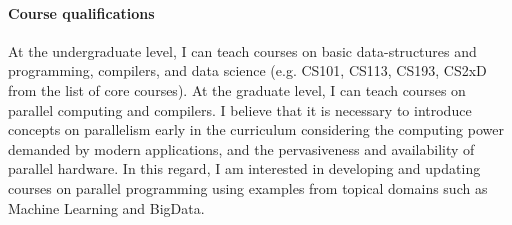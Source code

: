 \paragraph{Course qualifications}
At the undergraduate level, I can teach courses on basic data-structures and programming, compilers, and data science (e.g. CS101, CS113, CS193, CS2xD from the list of core courses). At the graduate level, I can teach courses on parallel computing and compilers.
I believe that it is necessary to introduce concepts on parallelism early in the curriculum considering the computing power demanded by modern applications, and the pervasiveness and availability of parallel hardware. 
In this regard, I am interested in developing and updating courses on parallel programming using examples from topical domains such as Machine Learning and BigData.







  

